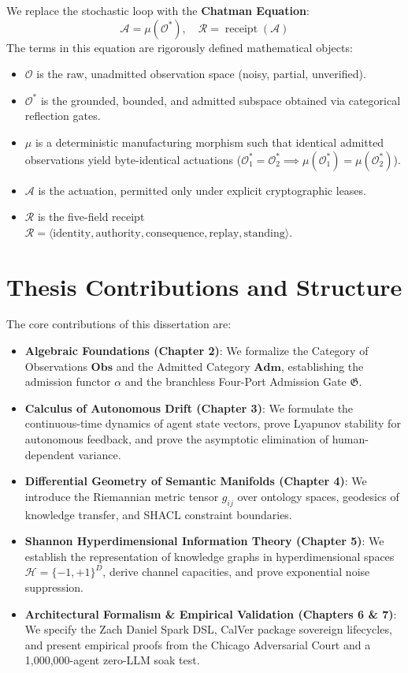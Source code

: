 \documentclass[12pt,oneside,a4paper]{book}
\theoremstyle{definition}
\theoremstyle{plain}
\theoremstyle{remark}
\DeclareMathOperator{\receipt}{receipt}
\begin{document}
We replace the stochastic loop with the \textbf{Chatman Equation}:
\begin{equation}
    \mathcal{A} = \mu(\mathcal{O}^*), \quad \mathcal{R} = \receipt(\mathcal{A})
\end{equation}
The terms in this equation are rigorously defined mathematical objects:
\begin{itemize}
    \item $\mathcal{O}$ is the raw, unadmitted observation space (noisy, partial, unverified).
    \item $\mathcal{O}^*$ is the grounded, bounded, and admitted subspace obtained via categorical reflection gates.
    \item $\mu$ is a deterministic manufacturing morphism such that identical admitted observations yield byte-identical actuations ($\mathcal{O}_1^* = \mathcal{O}_2^* \implies \mu(\mathcal{O}_1^*) = \mu(\mathcal{O}_2^*)$).
    \item $\mathcal{A}$ is the actuation, permitted only under explicit cryptographic leases.
    \item $\mathcal{R}$ is the five-field receipt $\mathcal{R} = \langle \text{identity}, \text{authority}, \text{consequence}, \text{replay}, \text{standing} \rangle$.
\end{itemize}

\section{Thesis Contributions and Structure}
The core contributions of this dissertation are:
\begin{itemize}
    \item \textbf{Algebraic Foundations (Chapter 2)}: We formalize the Category of Observations $\mathbf{Obs}$ and the Admitted Category $\mathbf{Adm}$, establishing the admission functor $\alpha$ and the branchless Four-Port Admission Gate $\mathfrak{G}$.
    \item \textbf{Calculus of Autonomous Drift (Chapter 3)}: We formulate the continuous-time dynamics of agent state vectors, prove Lyapunov stability for autonomous feedback, and prove the asymptotic elimination of human-dependent variance.
    \item \textbf{Differential Geometry of Semantic Manifolds (Chapter 4)}: We introduce the Riemannian metric tensor $g_{ij}$ over ontology spaces, geodesics of knowledge transfer, and SHACL constraint boundaries.
    \item \textbf{Shannon Hyperdimensional Information Theory (Chapter 5)}: We establish the representation of knowledge graphs in hyperdimensional spaces $\mathcal{H} = \{-1, +1\}^D$, derive channel capacities, and prove exponential noise suppression.
    \item \textbf{Architectural Formalism \& Empirical Validation (Chapters 6 \& 7)}: We specify the Zach Daniel Spark DSL, CalVer package sovereign lifecycles, and present empirical proofs from the Chicago Adversarial Court and a 1,000,000-agent zero-LLM soak test.
\end{itemize}
\end{document}
